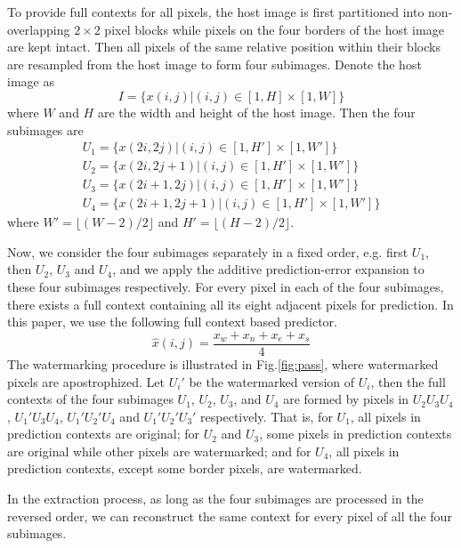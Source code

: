 \documentclass{article}
\begin{document}
To provide full contexts for all pixels, the host image is first partitioned into non-overlapping $2
\times 2$ pixel blocks while pixels on the four borders of the host image are kept intact. Then all
pixels of the same relative position within their blocks are resampled from the host image to form
four subimages. Denote the host image as 
\begin{equation}
 I = \{ x(i,j) | (i,j) \in [1,H] \times [1,W]\} 
\end{equation}
where $W$ and $H$ are the width and height of the host image. Then the four subimages are
\begin{equation}
  \begin{array}{l}
 U_1 = \{ x(2i,2j) | (i,j) \in [1,H'] \times [1,W'] \} \\
 U_2 = \{ x(2i,2j+1) | (i,j) \in [1,H'] \times [1,W'] \} \\
 U_3 = \{ x(2i+1,2j) | (i,j) \in [1,H'] \times [1,W'] \} \\
 U_4 = \{ x(2i+1,2j+1) | (i,j) \in [1,H'] \times [1,W'] \} 
 \end{array}
\end{equation}
where $W'= \lfloor (W-2)/2 \rfloor$ and $H' = \lfloor (H-2)/2 \rfloor$. 

Now, we consider the four subimages separately in a fixed order, e.g. first $U_1$, then $U_2$, $U_3$
and $U_4$, and we apply the additive prediction-error expansion to these four subimages
respectively. For every pixel in each of the four subimages, there exists a full context containing
all its eight adjacent pixels for prediction. In this paper, we use the following full context based
predictor.
\begin{equation}
 \hat{x}(i,j) = \frac{x_w + x_n + x_e + x_s}{4} 
\end{equation}
The watermarking procedure is illustrated in Fig.\ref{fig:pass}, where watermarked pixels are
apostrophized. Let $U_i'$ be the watermarked version of $U_i$, then the full contexts of the four
subimages $U_1$, $U_2$, $U_3$, and $U_4$ are formed by pixels in $U_2 U_3 U_4$, $U_1' U_3 U_4$,
$U_1' U_2' U_4$ and $U_1' U_2' U_3'$ respectively. That is, for $U_1$, all pixels in prediction
contexts are original; for $U_2$ and $U_3$, some pixels in prediction contexts are original while
other pixels are watermarked; and for $U_4$, all pixels in prediction contexts, except some border
pixels, are watermarked.

In the extraction process, as long as the four subimages are processed in the reversed order, we can
reconstruct the same context for every pixel of all the four subimages.
\end{document}
